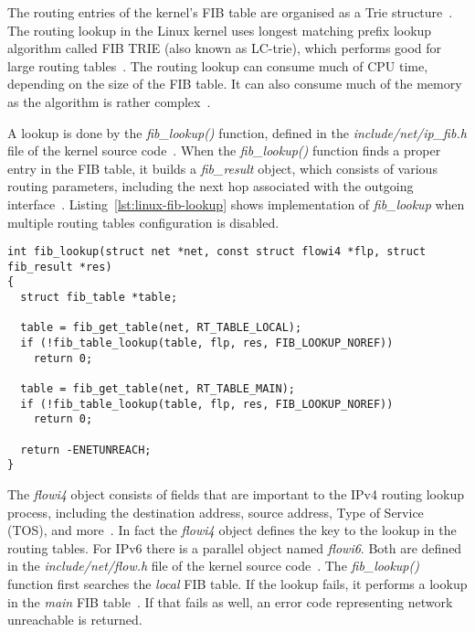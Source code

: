 The routing entries of the kernel's FIB table are organised as a Trie structure~\cite{linux-kernel-networking}.
The routing lookup in the Linux kernel uses longest matching prefix lookup algorithm
called FIB TRIE (also known as LC-trie), which performs good for large routing tables~\cite{linux-kernel-networking}.
The routing lookup can consume much of CPU time, depending on the size of the FIB table.
It can also consume much of the memory as the algorithm is rather complex~\cite{linux-kernel-networking}.

A lookup is done by the {\it{fib\_lookup()}} function, defined in the {\it{include/net/ip\_fib.h}} file
of the kernel source code~\cite{kernel-source}.
When the {\it{fib\_lookup()}} function finds a proper entry in the FIB table,
it builds a {\it{fib\_result}} object, which consists of various routing parameters,
including the next hop associated with the outgoing interface~\cite{linux-kernel-networking}.
Listing~\ref{lst:linux-fib-lookup} shows implementation of {\it{fib\_lookup}} when
multiple routing tables configuration is disabled.

\bigskip
\begin{lstlisting}[caption={Implementation of the fib\_lookup() function},label={lst:linux-fib-lookup}]
int fib_lookup(struct net *net, const struct flowi4 *flp, struct fib_result *res)
{
  struct fib_table *table;

  table = fib_get_table(net, RT_TABLE_LOCAL);
  if (!fib_table_lookup(table, flp, res, FIB_LOOKUP_NOREF))
    return 0;

  table = fib_get_table(net, RT_TABLE_MAIN);
  if (!fib_table_lookup(table, flp, res, FIB_LOOKUP_NOREF))
    return 0;

  return -ENETUNREACH;
}
\end{lstlisting}

The {\it{flowi4}} object consists of fields that are important to the IPv4 routing lookup process, including the
destination address, source address, Type of Service (TOS), and more~\cite{linux-kernel-networking}.
In fact the {\it{flowi4}} object defines the key to the lookup in the routing tables.
For IPv6 there is a parallel object named {\it{flowi6}}.
Both are defined in the {\it{include/net/flow.h}} file of the kernel source code~\cite{kernel-source}.
The {\it{fib\_lookup()}} function first searches the {\it{local}} FIB table.
If the lookup fails, it performs a lookup in the {\it{main}} FIB table~\cite{linux-kernel-networking}.
If that fails as well, an error code representing network unreachable is returned.

